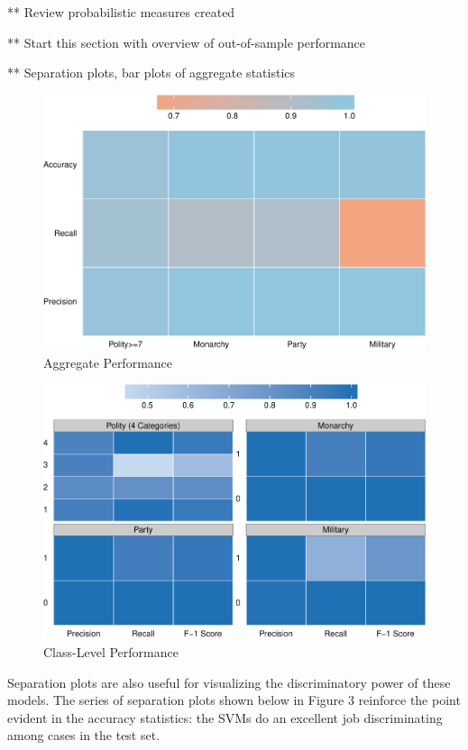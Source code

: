 \documentclass[pdftex,12pt,fullpage,oneside]{amsart}
\begin{document}
** Review probabilistic measures created

** Start this section with overview of out-of-sample performance

** Separation plots, bar plots of aggregate statistics

\begin{figure}[ht]
	\centering
	\includegraphics[width=.7\textwidth]{allAggPerf}	
	\caption{Aggregate Performance}
	\label{fig:aggPerf}
\end{figure}
\FloatBarrier

\begin{figure}[ht]
	\centering
	\includegraphics[width=.7\textwidth]{allClassPerf}		
	\caption{Class-Level Performance}
	\label{fig:classPerf}
\end{figure}
\FloatBarrier

Separation plots are also useful for visualizing the discriminatory power of these models. The series of separation plots shown below in Figure 3 reinforce the point evident in the accuracy statistics: the SVMs do an excellent job discriminating among cases in the test set.
\end{document}
